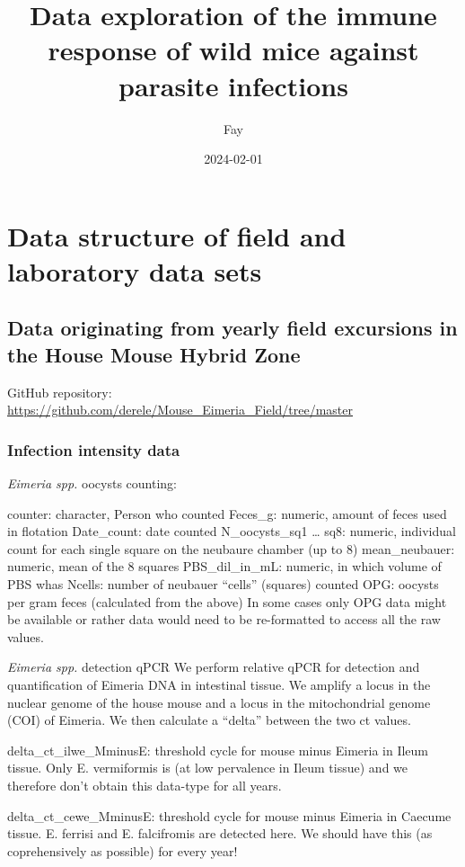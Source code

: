 \documentclass[
]{article}
\title{Data exploration of the immune response of wild mice against
parasite infections}
\author{Fay}
\date{2024-02-01}
\begin{document}
\maketitle

\section{Data structure of field and laboratory data
sets}\label{data-structure-of-field-and-laboratory-data-sets}

\subsection{Data originating from yearly field excursions in the House
Mouse Hybrid
Zone}\label{data-originating-from-yearly-field-excursions-in-the-house-mouse-hybrid-zone}

GitHub repository:
\url{https://github.com/derele/Mouse_Eimeria_Field/tree/master}

\subsubsection{Infection intensity data}\label{infection-intensity-data}

\emph{Eimeria spp.} oocysts counting:

counter: character, Person who counted Feces\_g: numeric, amount of
feces used in flotation Date\_count: date counted N\_oocysts\_sq1
\ldots{} sq8: numeric, individual count for each single square on the
neubaure chamber (up to 8) mean\_neubauer: numeric, mean of the 8
squares PBS\_dil\_in\_mL: numeric, in which volume of PBS whas Ncells:
number of neubauer ``cells'' (squares) counted OPG: oocysts per gram
feces (calculated from the above) In some cases only OPG data might be
available or rather data would need to be re-formatted to access all the
raw values.

\emph{Eimeria spp.} detection qPCR We perform relative qPCR for
detection and quantification of Eimeria DNA in intestinal tissue. We
amplify a locus in the nuclear genome of the house mouse and a locus in
the mitochondrial genome (COI) of Eimeria. We then calculate a ``delta''
between the two ct values.

delta\_ct\_ilwe\_MminusE: threshold cycle for mouse minus Eimeria in
Ileum tissue. Only E. vermiformis is (at low pervalence in Ileum tissue)
and we therefore don't obtain this data-type for all years.

delta\_ct\_cewe\_MminusE: threshold cycle for mouse minus Eimeria in
Caecume tissue. E. ferrisi and E. falcifromis are detected here. We
should have this (as coprehensively as possible) for every year!
\end{document}
